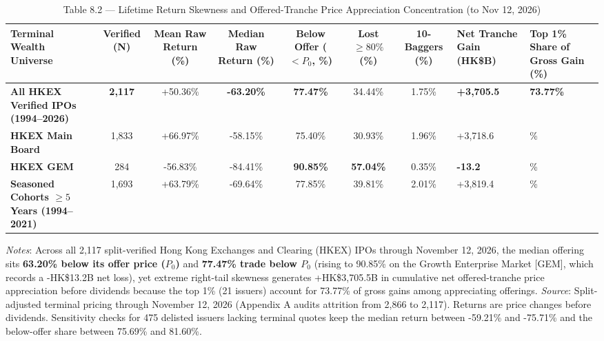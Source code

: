 \documentclass[11pt,letterpaper]{article}
\begin{document}
\begin{table}[!htbp]
\centering
\caption*{Table 8.2 — Lifetime Return Skewness and Offered-Tranche Price Appreciation Concentration (to Nov 12, 2026)}
\begin{adjustbox}{max width=\textwidth,max totalheight=0.79\textheight}
\begin{minipage}{\textwidth}\centering
\scriptsize
\setlength{\tabcolsep}{3.5pt}
\renewcommand{\arraystretch}{1.18}
\begin{adjustbox}{max width=\textwidth}
\begin{tabular}{>{\raggedright\arraybackslash}p{3.80cm}cccccc>{\centering\arraybackslash}p{2.18cm}>{\centering\arraybackslash}p{2.72cm}}
\toprule
Terminal Wealth Universe & Verified (N) & Mean Raw Return (\%) & Median Raw Return (\%) & Below Offer ($<P_0$, \%) & Lost $\ge 80\%$ (\%) & 10-Baggers (\%) & Net Tranche Gain (HK\$B) & Top 1\% Share of Gross Gain (\%) \\
\midrule
\textbf{All HKEX Verified IPOs (1994–2026)} & \textbf{2,117} & +50.36\% & \textbf{-63.20\%} & \textbf{77.47\%} & 34.44\% & 1.75\% & \textbf{+3,705.5} & \textbf{73.77\%} \\
\textbf{HKEX Main Board} & 1,833 & +66.97\% & -58.15\% & 75.40\% & 30.93\% & 1.96\% & +3,718.6 & 71.07\% \\
\textbf{HKEX GEM} & 284 & -56.83\% & -84.41\% & \textbf{90.85\%} & \textbf{57.04\%} & 0.35\% & \textbf{-13.2} & 50.65\% \\
\textbf{Seasoned Cohorts $\ge 5$ Years (1994–2021)} & 1,693 & +63.79\% & -69.64\% & 77.85\% & 39.81\% & 2.01\% & +3,819.4 & 72.04\% \\
\bottomrule
\end{tabular}
\end{adjustbox}
\end{minipage}
\end{adjustbox}
\par\vspace{3pt}\noindent\parbox{\textwidth}{\scriptsize\raggedright \textit{Notes}: Across all 2,117 split-verified Hong Kong Exchanges and Clearing (HKEX) IPOs through November 12, 2026, the median offering sits \textbf{63.20\% below its offer price ($P_0$)} and \textbf{77.47\% trade below $P_0$} (rising to 90.85\% on the Growth Enterprise Market [GEM], which records a -HK\$13.2B net loss), yet extreme right-tail skewness generates +HK\$3,705.5B in cumulative net offered-tranche price appreciation before dividends because the top 1\% (21 issuers) account for 73.77\% of gross gains among appreciating offerings. \textit{Source}: Split-adjusted terminal pricing through November 12, 2026 (Appendix A audits attrition from 2,866 to 2,117). Returns are price changes before dividends. Sensitivity checks for 475 delisted issuers lacking terminal quotes keep the median return between -59.21\% and -75.71\% and the below-offer share between 75.69\% and 81.60\%.}
\end{table}
\end{document}
